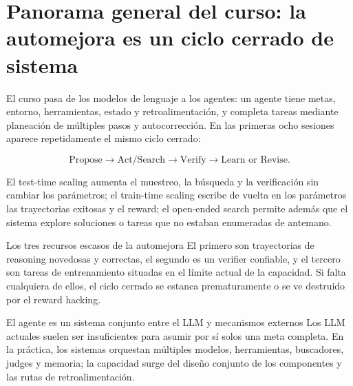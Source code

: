 \documentclass[a4paper]{article}
\begin{document}
\makelecturetitle

\section{Panorama general del curso: la automejora es un ciclo cerrado de sistema}

El curso pasa de los modelos de lenguaje a los agentes: un agente tiene metas, entorno, herramientas, estado y retroalimentación, y completa tareas mediante planeación de múltiples pasos y autocorrección. En las primeras ocho sesiones aparece repetidamente el mismo ciclo cerrado:

$$
\text{Propose}\rightarrow \text{Act/Search}\rightarrow
\text{Verify}\rightarrow \text{Learn or Revise}.
$$

El test-time scaling aumenta el muestreo, la búsqueda y la verificación sin cambiar los parámetros; el train-time scaling escribe de vuelta en los parámetros las trayectorias exitosas y el reward; el open-ended search permite además que el sistema explore soluciones o tareas que no estaban enumeradas de antemano.



\begin{importantbox}{Los tres recursos escasos de la automejora}
El primero son trayectorias de reasoning novedosas y correctas, el segundo es un verifier confiable, y el tercero son tareas de entrenamiento situadas en el límite actual de la capacidad. Si falta cualquiera de ellos, el ciclo cerrado se estanca prematuramente o se ve destruido por el reward hacking.
\end{importantbox}

\begin{knowledgebox}{El agente es un sistema conjunto entre el LLM y mecanismos externos}
Los LLM actuales suelen ser insuficientes para asumir por sí solos una meta completa. En la práctica, los sistemas orquestan múltiples modelos, herramientas, buscadores, judges y memoria; la capacidad surge del diseño conjunto de los componentes y las rutas de retroalimentación.
\end{knowledgebox}
\end{document}
